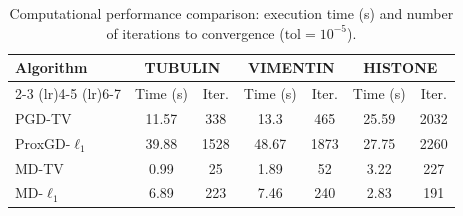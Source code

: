 \documentclass[letterpaper]{article}
\begin{document}
\begin{table}[h]
    \centering
    \caption{Computational performance comparison: execution time (s) and number of 
    iterations to convergence ($\text{tol} = 10^{-5}$).}
    \label{tab:convergence_results}
    \small
    \begin{tabular}{lcccccc}
        \toprule
        \multirow{2}{*}{\textbf{Algorithm}} 
            & \multicolumn{2}{c}{\textbf{TUBULIN}} 
            & \multicolumn{2}{c}{\textbf{VIMENTIN}} 
            & \multicolumn{2}{c}{\textbf{HISTONE}} \\
        \cmidrule(lr){2-3} \cmidrule(lr){4-5} \cmidrule(lr){6-7} 
        & Time (s) & Iter. & Time (s) & Iter. 
        & Time (s) & Iter. \\
        \midrule
        PGD-TV   & 11.57 & 338 & 13.3 & 465 & 25.59 & 2032  \\
        ProxGD-$\ell_1$   & 39.88 & 1528 & 48.67 & 1873 & 27.75 & 2260  \\
        MD-TV    &  0.99 &  25 &  1.89 &  52 &  3.22 &  227 \\
        MD-$\ell_1$  & 6.89 &  223  &  7.46 &  240 & 2.83 &  191 \\
        \bottomrule
    \end{tabular}
\end{table}



\end{document}
